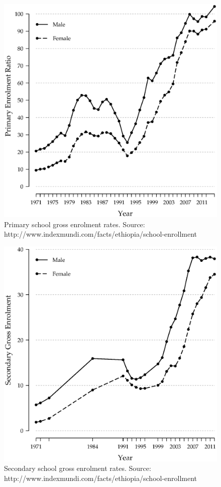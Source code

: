 \documentclass[a4paper, twocolumn]{article}
\begin{document}
\begin{figure}[!hbtp]
\includegraphics[width = \columnwidth]{../figures/fig6.eps}
\caption{Primary school gross enrolment rates. Source: http://www.indexmundi.com/facts/ethiopia/school-enrollment}\label{Fig:6}
\end{figure}


\begin{figure}[!hbtp]
\includegraphics[width = \columnwidth]{../figures/fig7.eps}
\caption{Secondary school gross enrolment rates. Source: http://www.indexmundi.com/facts/ethiopia/school-enrollment}\label{Fig:7}
\end{figure}
\end{document}
